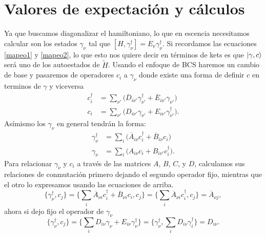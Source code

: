 \section{Valores de expectaci\'{o}n y c\'{a}lculos}
Ya que buscamos diagonalizar el hamiltoniano, lo que en escencia necesitamos calcular son los estados $\gamma_\nu$ tal que $[H,\gamma^\dagger_\nu]=E_\nu\gamma_\nu^\dagger$. Si recordamos las ecuaciones \ref{mapeo1} y \ref{mapeo2}, lo que esto nos quiere decir en t\'{e}rminos de kets es que $\ket{\gamma,c}$ ser\'{a} uno de los autoestados de $\tilde H$.
Usando el enfoque de BCS haremos un cambio de base y pasaremos de operadores $c_i$ a $\gamma_\nu$ donde existe una forma de definir $c$ en terminos de $\gamma$ y viceversa
\begin{equation}
\begin{split}
        c_i^\dagger&=\sum_{\nu'}\Big( \overline{D}_{i\nu'}\gamma^\dagger_{\nu'}+\overline{E}_{i\nu'}\gamma_{\nu'} \Big)\\
        c_i&=\sum_{\nu'}\Big( D_{i\nu'}\gamma_{\nu'}+E_{i\nu'}\gamma^\dagger_{\nu'} \Big).
\end{split}
\label{eq:c_to_gamma}
\end{equation}
As\'{i}mismo los $\gamma_\nu$ en general tendr\'{a}n la forma: 
\begin{equation}
    \begin{split}
         \gamma^\dagger_\nu&=\sum_{i}\Big( \overline{A}_{i\nu}c^\dagger_{i}+\overline{B}_{i\nu}c_{i} \Big)\\
        \gamma_\nu&=\sum_{i}\Big( A_{i\nu}c_{i}+B_{i\nu'}c^\dagger_{i} \Big).       
    \end{split}
    \label{eq:gamma_to_c}
\end{equation}
Para relacionar $\gamma_\nu$ y $c_i$ a trav\'{e}s de las matrices $A$, $B$, $C$, y $D$, calculamos sus relaciones de conmutaci\'{o}n primero dejando el segundo operador fijo, mientras que el otro lo expresamos usando las ecuaciones de arriba.
\begin{equation}
    \{\gamma^\dagger_\nu,c_j\}=\Big\{\sum_i \overline{A}_{\nu i} c_i^\dagger+\overline{B}_{\nu i}c_i,c_j\Big\}=\Big\{\sum_i \overline{A}_{\nu i} c_i^\dagger,c_j\Big\}=\overline{A}_{\nu j},
\end{equation}
ahora si dejo fijo el operador de $\gamma_\nu$
\begin{equation}
    \{\gamma^\dagger_\nu,c_j\}=\Big\{\sum_i D_{i \nu} \gamma_\nu+E_{i \nu}\gamma^\dagger_\nu\Big\}=\Big\{\gamma^\dagger_\nu,\sum_i D_{i \nu} \gamma_i^\dagger\Big\}=D_{i \nu}.
\end{equation}
